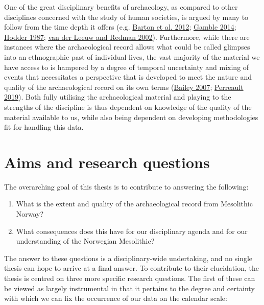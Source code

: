 \documentclass[
  12pt,
  a4paper,
  oneside]{book}
\providecommand{\tightlist}{%
  \setlength{\itemsep}{0pt}\setlength{\parskip}{0pt}}
\begin{document}
One of the great disciplinary benefits of archaeology, as compared to other disciplines concerned with the study of human societies, is argued by many to follow from the time depth it offers (e.g. \protect\hyperlink{ref-barton2012}{Barton et al. 2012}; \protect\hyperlink{ref-gamble2014}{Gamble 2014}; \protect\hyperlink{ref-hodder1987}{Hodder 1987}; \protect\hyperlink{ref-vanderleeuw2002}{van der Leeuw and Redman 2002}). Furthermore, while there are instances where the archaeological record allows what could be called glimpses into an ethnographic past of individual lives, the vast majority of the material we have access to is hampered by a degree of temporal uncertainty and mixing of events that necessitates a perspective that is developed to meet the nature and quality of the archaeological record on its own terms (\protect\hyperlink{ref-bailey2007}{Bailey 2007}; \protect\hyperlink{ref-perreault2019}{Perreault 2019}). Both fully utilising the archaeological material and playing to the strengths of the discipline is thus dependent on knowledge of the quality of the material available to us, while also being dependent on developing methodologies fit for handling this data.

\hypertarget{aims-and-research-questions}{%
\section{Aims and research questions}\label{aims-and-research-questions}}

The overarching goal of this thesis is to contribute to answering the following:

\begin{enumerate}
\def\labelenumi{\roman{enumi})}
\tightlist
\item
  What is the extent and quality of the archaeological record from Mesolithic Norway?
\item
  What consequences does this have for our disciplinary agenda and for our understanding of the Norwegian Mesolithic?
\end{enumerate}

The answer to these questions is a disciplinary-wide undertaking, and no single thesis can hope to arrive at a final answer. To contribute to their elucidation, the thesis is centred on three more specific research questions. The first of these can be viewed as largely instrumental in that it pertains to the degree and certainty with which we can fix the occurrence of our data on the calendar scale:
\end{document}
